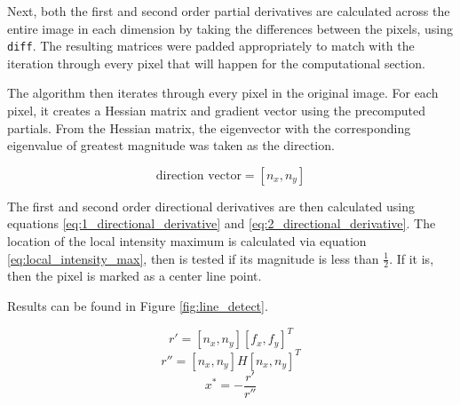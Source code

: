 \documentclass{article}
\begin{document}
Next, both the first and second order partial derivatives are calculated across the entire image in each dimension by taking the differences between the pixels, using \texttt{diff}. The resulting matrices were padded appropriately to match with the iteration through every pixel that will happen for the computational section.

The algorithm then iterates through every pixel in the original image. For each pixel, it creates a Hessian matrix and gradient vector using the precomputed partials. From the Hessian matrix, the eigenvector with the corresponding eigenvalue of greatest magnitude was taken as the direction.

\begin{equation}
\text{direction vector} = [n_x, n_y]
\label{eq:direction}
\end{equation}

The first and second order directional derivatives are then calculated using equations \ref{eq:1_directional_derivative} and \ref{eq:2_directional_derivative}. The location of the local intensity maximum is calculated via equation \ref{eq:local_intensity_max}, then is tested if its magnitude is less than $\frac{1}{2}$. If it is, then the pixel is marked as a center line point.

Results can be found in Figure \ref{fig:line_detect}.

\begin{equation}
r' = [n_x,n_y][f_x,f_y]^T
\label{eq:1_directional_derivative}
\end{equation}
\begin{equation}
r'' = [n_x,n_y]H[n_x,n_y]^T
\label{eq:2_directional_derivative}
\end{equation}
\begin{equation}
x^* = -\frac{r'}{r''}
\label{eq:local_intensity_max}
\end{equation}
\end{document}
